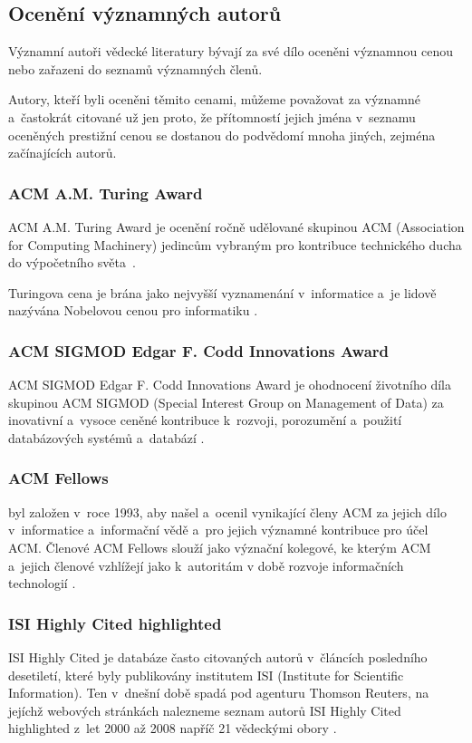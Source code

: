 \documentclass{bakalarka}
\begin{document}
\subsection{Ocenění významných autorů}
Významní autoři vědecké literatury bývají za své dílo oceněni významnou cenou
nebo zařazeni do seznamů významných členů.

Autory, kteří byli oceněni těmito cenami, můžeme považovat za významné
a~častokrát citované už jen proto, že přítomností jejich jména v~seznamu
oceněných prestižní cenou se dostanou do podvědomí mnoha jiných, zejména
začínajících autorů.

\subsubsection{ACM A.M. Turing Award}
ACM A.M. Turing Award je ocenění ročně udělované skupinou ACM (Association for
Computing Machinery) jedincům vybraným pro kontribuce technického ducha do
výpočetního světa~\citep{turingaward}.

Turingova cena je brána jako nejvyšší vyznamenání v~informatice a~je lidově
nazývána Nobelovou cenou pro informatiku \citep{dasgupta}.

\subsubsection{ACM SIGMOD Edgar F. Codd Innovations Award}
ACM SIGMOD Edgar F. Codd Innovations Award je ohodnocení životního díla
skupinou ACM SIGMOD (Special Interest Group on Management of Data) za
inovativní a~vysoce ceněné kontribuce k~rozvoji, porozumění a~použití
databázových systémů a~databází \citep{sigmodinnovations}.

\subsubsection{ACM Fellows}
 byl založen v~roce 1993, aby našel a~ocenil
vynikající členy ACM za jejich dílo v~informatice a~informační vědě a~pro
jejich významné kontribuce pro účel ACM. Členové ACM Fellows slouží jako
význační kolegové, ke kterým ACM a~jejich členové vzhlížejí jako k~autoritám v
době rozvoje informačních technologií \citep{acmfellows}.

\subsubsection{ISI Highly Cited highlighted}
ISI Highly Cited je databáze často citovaných autorů v~článcích posledního
desetiletí, které byly publikovány institutem ISI (Institute for Scientific
Information). Ten v~dnešní době spadá pod agenturu Thomson Reuters, na jejíchž
webových stránkách nalezneme seznam autorů ISI Highly Cited highlighted z~let
2000 až 2008 napříč 21 vědeckými obory \citep{highlycited}.
\end{document}
